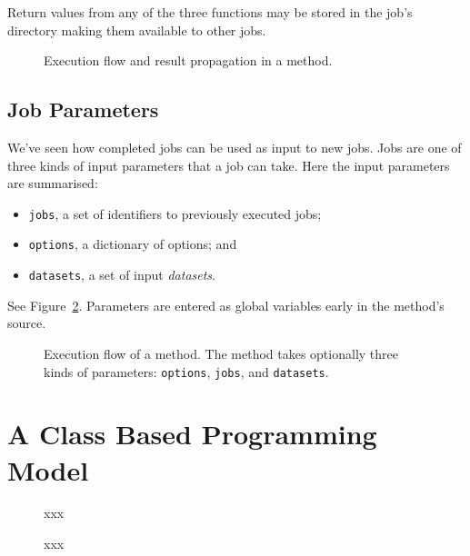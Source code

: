 Return values from any of the three functions may be stored in the
job's directory making them available to other jobs.


\begin{figure}[h!]
  \begin{center}
    
    \caption{Execution flow and result propagation in a method.}
    \label{fig:prepanasyn}
  \end{center}
\end{figure}



\subsection{Job Parameters}
\label{sec:jobparams}
We've seen how completed jobs can be used as input to new
jobs.  Jobs are one of three kinds of input parameters that
a job can take.  Here the input parameters are summarised:
\begin{itemize}
\item[] \texttt{jobs}, a set of identifiers to previously executed jobs;
\item[] \texttt{options}, a dictionary of options; and
\item[] \texttt{datasets}, a set of input \textsl{datasets}.
\end{itemize}
See Figure~\ref{fig:execflow}.  Parameters are entered as global
variables early in the method's source.


\begin{figure}[h!]
  \begin{center}
    
    \caption{Execution flow of a method.  The method takes optionally
      three kinds of parameters: \texttt{options}, \texttt{jobs},
      and \texttt{datasets}.}
    \label{fig:execflow}
  \end{center}
\end{figure}





\section{A Class Based Programming Model}

\begin{figure}[h!]
  \begin{center}
    
    \caption{xxx}
    \label{fig:classes}
  \end{center}
\end{figure}

\begin{figure}[h!]
  \begin{center}
    
    \caption{xxx}
    \label{fig:classes}
  \end{center}
\end{figure}





